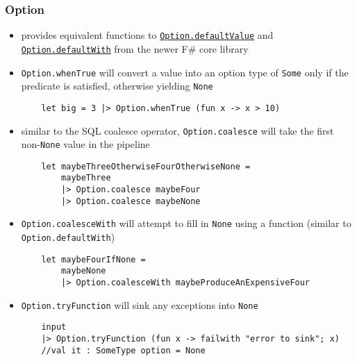 \documentclass{article}
\begin{document}
\subsubsection{Option}

\begin{itemize}
\item provides equivalent functions to \href{https://github.com/fsharp/fsharp/blob/1de369ca6f4564044ff6adee667a5da54f8b7138/src/fsharp/FSharp.Core/option.fs#L20}{\texttt{Option.defaultValue}} and \href{https://github.com/fsharp/fsharp/blob/1de369ca6f4564044ff6adee667a5da54f8b7138/src/fsharp/FSharp.Core/option.fs#L23}{\texttt{Option.defaultWith}} from the newer F\# core library

\item \texttt{Option.whenTrue} will convert a value into an option type of \texttt{Some} only if the predicate is satisfied, otherwise yielding \texttt{None}
\begin{verbatim}
    let big = 3 |> Option.whenTrue (fun x -> x > 10)
\end{verbatim}

\item similar to the SQL coalesce operator, \texttt{Option.coalesce} will take the first non-\texttt{None} value in the pipeline
\begin{verbatim}
    let maybeThreeOtherwiseFourOtherwiseNone =
        maybeThree
        |> Option.coalesce maybeFour
        |> Option.coalesce maybeNone
\end{verbatim}

\item \texttt{Option.coalesceWith} will attempt to fill in \texttt{None} using a function (similar to \texttt{Option.defaultWith})
\begin{verbatim}
    let maybeFourIfNone =
        maybeNone
        |> Option.coalesceWith maybeProduceAnExpensiveFour
\end{verbatim}

\item \texttt{Option.tryFunction} will sink any exceptions into \texttt{None}

\begin{verbatim}
    input
    |> Option.tryFunction (fun x -> failwith "error to sink"; x)
    //val it : SomeType option = None
\end{verbatim}


\end{itemize}
\end{document}
